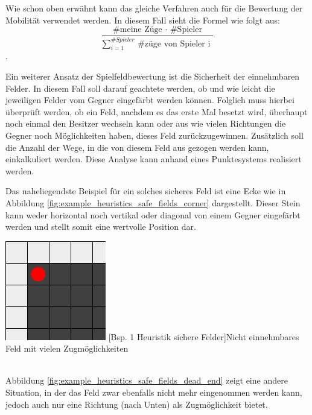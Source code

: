 \documentclass[12pt,a4paper,bibliography=totocnumbered,listof=totocnumbered]{article}
\begin{document}
Wie schon oben erwähnt kann das gleiche Verfahren auch für die Bewertung der Mobilität verwendet werden. In diesem Fall sieht die Formel wie folgt aus:
\[ \frac{ \text{ \# meine Züge } \cdot \text{ \# Spieler } }{ \sum_{i=1}^{ \#Spieler} \text{ \# züge von Spieler i } }  \].


Ein weiterer Ansatz der Spielfeldbewertung ist die \glqq Sicherheit\grqq{} der einnehmbaren Felder. In diesem Fall soll darauf geachtete werden, ob und wie leicht die jeweiligen Felder vom Gegner eingefärbt werden können. Folglich muss hierbei überprüft werden, ob ein Feld, nachdem es das erste Mal besetzt wird, überhaupt noch einmal den Besitzer wechseln kann oder aus wie vielen Richtungen die Gegner noch Möglichkeiten haben, dieses Feld zurückzugewinnen. Zusätzlich soll die Anzahl der Wege, in die von diesem Feld aus gezogen werden kann, einkalkuliert werden. Diese Analyse kann anhand eines Punktesystems realisiert werden.

Das naheliegendste Beispiel für ein solches sicheres Feld ist eine Ecke wie in Abbildung \ref{fig:example_heuristics_safe_fields_corner} dargestellt. Dieser Stein kann weder horizontal noch vertikal oder diagonal von einem Gegner eingefärbt werden und stellt somit eine wertvolle Position dar. 

\vspace{1em}
\begin{minipage}{\linewidth}
	\centering
	\includegraphics[width=0.3\linewidth]{pics/heuristics_safe_fields_corner.png}
	[Bsp. 1 Heuristik sichere Felder]{Nicht einnehmbares Feld mit vielen 		Zugmöglichkeiten}
	\label{fig:example_heuristics_safe_fields_corner}
\end{minipage}
\\

Abbildung \ref{fig:example_heuristics_safe_fields_dead_end} zeigt eine andere Situation, in der das Feld zwar ebenfalls nicht mehr eingenommen werden kann, jedoch auch nur eine Richtung (nach Unten) als Zugmöglichkeit bietet.
\end{document}
